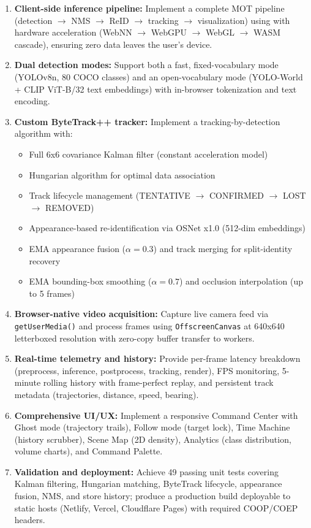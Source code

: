 \begin{enumerate}
    \item \textbf{Client-side inference pipeline:} Implement a complete MOT pipeline (detection $\to$ NMS $\to$ ReID $\to$ tracking $\to$ visualization) using \onnxweb with hardware acceleration (WebNN $\to$ WebGPU $\to$ WebGL $\to$ WASM cascade), ensuring zero data leaves the user's device.
    
    \item \textbf{Dual detection modes:} Support both a fast, fixed-vocabulary mode (YOLOv8n, 80 COCO classes) and an open-vocabulary mode (YOLO-World + CLIP ViT-B/32 text embeddings) with in-browser tokenization and text encoding.
    
    \item \textbf{Custom ByteTrack++ tracker:} Implement a tracking-by-detection algorithm with:
    \begin{itemize}
        \item Full 6x6 covariance Kalman filter (constant acceleration model)
        \item Hungarian algorithm for optimal data association
        \item Track lifecycle management (TENTATIVE $\to$ CONFIRMED $\to$ LOST $\to$ REMOVED)
        \item Appearance-based re-identification via OSNet x1.0 (512-dim embeddings)
        \item EMA appearance fusion ($\alpha=0.3$) and track merging for split-identity recovery
        \item EMA bounding-box smoothing ($\alpha=0.7$) and occlusion interpolation (up to 5 frames)
    \end{itemize}
    
    \item \textbf{Browser-native video acquisition:} Capture live camera feed via \texttt{getUserMedia()} and process frames using \texttt{OffscreenCanvas} at 640x640 letterboxed resolution with zero-copy buffer transfer to workers.
    
    \item \textbf{Real-time telemetry and history:} Provide per-frame latency breakdown (preprocess, inference, postprocess, tracking, render), FPS monitoring, 5-minute rolling history with frame-perfect replay, and persistent track metadata (trajectories, distance, speed, bearing).
    
    \item \textbf{Comprehensive UI/UX:} Implement a responsive Command Center with Ghost mode (trajectory trails), Follow mode (target lock), Time Machine (history scrubber), Scene Map (2D density), Analytics (class distribution, volume charts), and Command Palette.
    
    \item \textbf{Validation and deployment:} Achieve 49 passing unit tests covering Kalman filtering, Hungarian matching, ByteTrack lifecycle, appearance fusion, NMS, and store history; produce a production build deployable to static hosts (Netlify, Vercel, Cloudflare Pages) with required COOP/COEP headers.
\end{enumerate}

